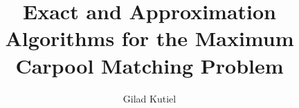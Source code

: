 \title
{Exact and Approximation Algorithms for the Maximum Carpool Matching Problem}

\author{
	Gilad Kutiel
}

